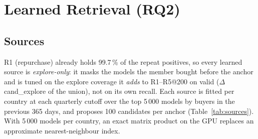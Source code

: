 \documentclass{ieeeaccess}
\begin{document}
\section{Learned Retrieval (RQ2)}
\label{sec:retrieval}

\subsection{Sources}
R1 (repurchase) already holds 99.7\,\% of the repeat positives, so every learned source is \emph{explore-only}: it masks the models the
member bought before the anchor and is tuned on the explore coverage it \emph{adds} to R1--R5@200 on valid ($\Delta$ cand\_explore of
the union), not on its own recall. Each source is fitted per country at each quarterly cutoff over the top 5\,000 models by buyers in
the previous 365 days, and proposes 100 candidates per anchor (Table~\ref{tab:sources}). With 5\,000 models per country, an exact
matrix product on the GPU replaces an approximate nearest-neighbour index.
\end{document}
